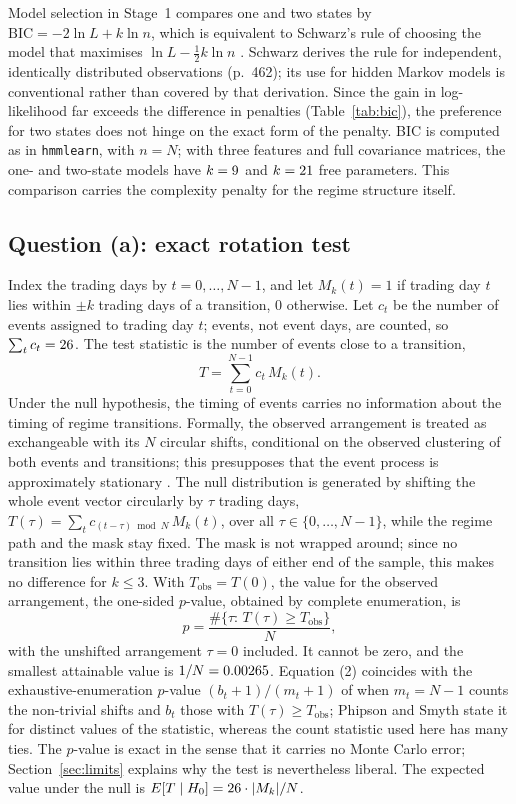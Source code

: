 \documentclass[11pt,a4paper]{article}
\begin{document}
Model selection in Stage~1 compares one and two states by $\mathrm{BIC}=-2\ln L+k\ln n$, which is equivalent to Schwarz's rule of choosing the model that maximises $\ln L-\tfrac12 k\ln n$ \citep[p.~461]{schwarz1978}. Schwarz derives the rule for independent, identically distributed observations (p.~462); its use for hidden Markov models is conventional rather than covered by that derivation. Since the gain in log-likelihood far exceeds the difference in penalties (Table~\ref{tab:bic}), the preference for two states does not hinge on the exact form of the penalty. BIC is computed as in \texttt{hmmlearn}, with $n=N$; with three features and full covariance matrices, the one- and two-state models have $k=9$ and $k=21$ free parameters. This comparison carries the complexity penalty for the regime structure itself.

\subsection{Question (a): exact rotation test}\label{sec:rotation}

Index the trading days by $t=0,\dots,N-1$, and let $M_k(t)=1$ if trading day $t$ lies within $\pm k$ trading days of a transition, $0$ otherwise. Let $c_t$ be the number of events assigned to trading day $t$; events, not event days, are counted, so $\sum_t c_t=26$. The test statistic is the number of events close to a transition,
\begin{equation}
T=\sum_{t=0}^{N-1} c_t\,M_k(t).
\end{equation}
Under the null hypothesis, the timing of events carries no information about the timing of regime transitions. Formally, the observed arrangement is treated as exchangeable with its $N$ circular shifts, conditional on the observed clustering of both events and transitions; this presupposes that the event process is approximately stationary \citep[p.~1]{mrkvicka2020}. The null distribution is generated by shifting the whole event vector circularly by $\tau$ trading days, $T(\tau)=\sum_t c_{(t-\tau)\bmod N}\,M_k(t)$, over all $\tau\in\{0,\dots,N-1\}$, while the regime path and the mask stay fixed. The mask is not wrapped around; since no transition lies within three trading days of either end of the sample, this makes no difference for $k\le 3$. With $T_{\mathrm{obs}}=T(0)$, the value for the observed arrangement, the one-sided $p$-value, obtained by complete enumeration, is
\begin{equation}
p=\frac{\#\{\tau:\,T(\tau)\ge T_{\mathrm{obs}}\}}{N},
\end{equation}
with the unshifted arrangement $\tau=0$ included. It cannot be zero, and the smallest attainable value is $1/N=0.00265$. Equation (2) coincides with the exhaustive-enumeration $p$-value $(b_t+1)/(m_t+1)$ of \citet[Sec.~5]{phipson2010} when $m_t=N-1$ counts the non-trivial shifts and $b_t$ those with $T(\tau)\ge T_{\mathrm{obs}}$; Phipson and Smyth state it for distinct values of the statistic, whereas the count statistic used here has many ties. The $p$-value is exact in the sense that it carries no Monte Carlo error; Section~\ref{sec:limits} explains why the test is nevertheless liberal. The expected value under the null is $E[T\mid H_0]=26\cdot|M_k|/N$.
\end{document}
